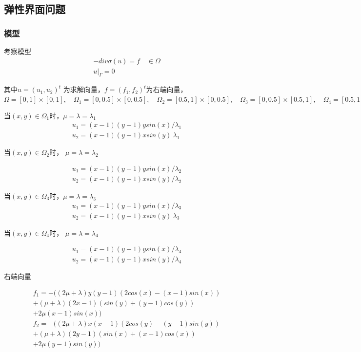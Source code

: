 \documentclass[a4paper,UTF8,titlepage]{ctexart}
\begin{document}
\subsection{弹性界面问题}

\subsubsection{模型}

考察模型
$$
\begin{matrix}
	-div \sigma(u) = f \quad \in \Omega  \\
	u |_{\Gamma} = 0
\end{matrix}
$$ 
\par
其中$ u = (u_1,u_2)^t $ 为求解向量，$ f = (f_1,f_2)^t $为右端向量，
$ 
\Omega = [0,1] \times [0,1] , \quad 
\Omega_1 = [0,0.5] \times [0,0.5] , \quad
\Omega_2 = [0.5,1] \times [0,0.5], \quad
\Omega_3 = [0,0.5] \times [0.5,1], \quad
\Omega_4 = [0.5,1] \times [0.5,1]
$ 
\par
当$(x,y) \in \Omega_1$时，$\mu = \lambda = \lambda_1$
$$
\begin{matrix}
	u_1 = (x - 1)(y - 1) y sin(x) / \lambda_1
	\\
	u_2 = (x - 1)(y - 1) x sin(y) \ \lambda_1
\end{matrix}
$$

当$(x,y) \in \Omega_2$时， $\mu = \lambda = \lambda_2$

$$
\begin{matrix}
	u_1 = (x - 1)(y - 1) y sin(x) / \lambda_2 
	\\
	u_2 = (x - 1)(y - 1) x sin(y) / \lambda_2
\end{matrix}
$$

当$(x,y) \in \Omega_3$时，$\mu = \lambda = \lambda_3$
$$
\begin{matrix}
	u_1 = (x - 1)(y - 1) y sin(x) / \lambda_3
	\\
	u_2 = (x - 1)(y - 1) x sin(y) \ \lambda_3
\end{matrix}
$$

当$(x,y) \in \Omega_4$时， $\mu = \lambda = \lambda_4$

$$
\begin{matrix}
	u_1 = (x - 1)(y - 1) y sin(x) / \lambda_4 
	\\
	u_2 = (x - 1)(y - 1) x sin(y) / \lambda_4
\end{matrix}
$$

右端向量

$$
\begin{matrix}
	f_1 = -((2 \mu + \lambda) y (y - 1) (2 cos(x) - (x - 1) sin(x)) \\
	+ (\mu + \lambda) (2 x - 1) (sin(y) + (y - 1) cos(y)) \\
	+ 2 \mu (x - 1) sin(x)) 
	\\
	f_2 = -((2 \mu + \lambda) x (x - 1) (2 cos(y) - (y - 1) sin(y)) \\
	+ (\mu + \lambda) (2 y - 1) (sin(x) + (x - 1) cos(x)) \\ 
	+ 2 \mu (y - 1) sin(y))
\end{matrix}
$$
\end{document}
